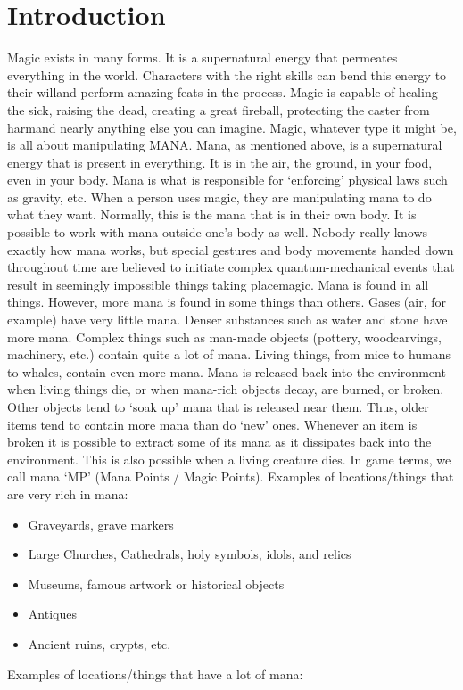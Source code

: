 \documentclass[twoside]{book}
\begin{document}
\section{Introduction}
      Magic exists in many forms. It is a supernatural
             energy that permeates everything in the world. Characters
             with the right skills can bend this energy to their
             willand perform amazing feats in the process. Magic
             is capable of healing the sick, raising the dead, creating a
             great fireball, protecting the caster from harmand
             nearly anything else you can imagine.   Magic, whatever type it might be, is all about
             manipulating MANA. Mana, as mentioned above, is a
             supernatural energy that is present in everything. It is in
             the air, the ground, in your food, even in your body. Mana
             is what is responsible for `enforcing' physical
             laws such as gravity, etc. When a person uses magic, they
             are manipulating mana to do what they want. Normally, this
             is the mana that is in their own body. It is possible to
             work with mana outside one's body as well. Nobody
             really knows exactly how mana works, but special gestures
             and body movements handed down throughout time are believed
             to initiate complex quantum-mechanical events that result in
             seemingly impossible things taking placemagic.
               Mana is found in all things. However, more mana is
             found in some things than others. Gases (air, for example)
             have very little mana. Denser substances such as water and
             stone have more mana. Complex things such as man-made
             objects (pottery, woodcarvings, machinery, etc.) contain
             quite a lot of mana. Living things, from mice to humans to
             whales, contain even more mana. Mana is released back into
             the environment when living things die, or when mana-rich
             objects decay, are burned, or broken. Other objects tend to
             `soak up' mana that is released near them. Thus,
             older items tend to contain more mana than do
             `new' ones. Whenever an item is broken it is
             possible to extract some of its mana as it dissipates back
             into the environment. This is also possible when a living
             creature dies. In game terms, we call mana `MP'
             (Mana Points / Magic Points).   Examples of locations/things that are very rich in
             mana: 
\begin{itemize}
      
  \item   Graveyards, grave markers 
  \item   Large Churches, Cathedrals, holy symbols, idols,
               and relics 
  \item   Museums, famous artwork or historical objects
               
  \item   Antiques 
  \item   Ancient ruins, crypts, etc. 
\end{itemize}
    Examples of locations/things that have a lot of mana:
             
\end{document}
